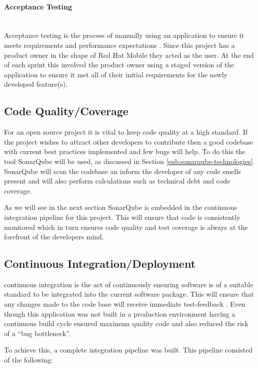 \paragraph{Acceptance Testing}\mbox{}\\
Acceptance testing is the process of manually using an application to ensure it meets requirements and performance expectations \citep{AcceptanceTesting2017}. Since this project has a product owner in the shape of Red Hat Mobile they acted as the user. At the end of each sprint this involved the product owner using a staged version of the application to ensure it met all of their initial requirements for the newly developed feature(s).

\subsection{Code Quality/Coverage}
\label{sub:code_quality}
For an open source project it is vital to keep code quality at a high standard. If the project wishes to attract other developers to contribute then a good codebase with current best practices implemented and few bugs will help. To do this the tool SonarQube will be used, as discussed in Section \ref{sub:sonarqube-technologies}. SonarQube will scan the codebase an inform the developer of any \gls{code smell}s present and will also perform calculations such as \gls{technical debt} and \gls{code coverage}. 

As we will see in the next section SonarQube is embedded in the \gls{continuous integration} pipeline for this project. This will ensure that code is consistently monitored which in turn ensures code quality and test coverage is always at the forefront of the developers mind.

\subsection{Continuous Integration/Deployment}
\label{sub:ci_cd}
\gls{continuous integration} is the act of continuously ensuring software is of a suitable standard to be integrated into the current software package. This will ensure that any changes made to the code base will receive immediate test-feedback \citep{Fowler2006}. Even though this application was not built in a production environment having a continuous build cycle ensured maximum quality code and also reduced the risk of a ``bug bottleneck''.

To achieve this, a complete integration pipeline was built. This pipeline consisted of the following:

